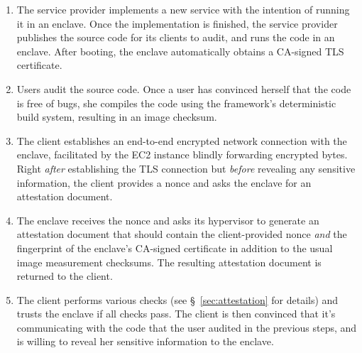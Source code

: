 \begin{enumerate}
    \item The service provider implements a new service with the intention of
      running it in an enclave.  Once the implementation is finished, the
      service provider publishes the source code for its clients to audit, and
      runs the code in an enclave.  After booting, the enclave automatically
      obtains a CA-signed TLS certificate.

    \item Users audit the source code.  Once a user has convinced herself that
      the code is free of bugs, she compiles the code using the framework's
      deterministic build system, resulting in an image checksum.

    \item The client establishes an end-to-end encrypted network connection with
      the enclave, facilitated by the EC2 instance blindly forwarding encrypted
      bytes.  Right \emph{after} establishing the TLS connection but
      \emph{before} revealing any sensitive information, the client provides a
      nonce and asks the enclave for an attestation document.

    \item The enclave receives the nonce and asks its hypervisor to generate an
      attestation document that should contain the client-provided nonce
      \emph{and} the fingerprint of the enclave's CA-signed certificate in
      addition to the usual image measurement checksums.  The
      resulting attestation document is returned to the client.

    \item The client performs various checks (see \S~\ref{sec:attestation} for
      details) and trusts the enclave if all checks pass.  The client is then
      convinced that it's communicating with the code that the user audited in
      the previous steps, and is willing to reveal her sensitive information to
      the enclave.
\end{enumerate}


